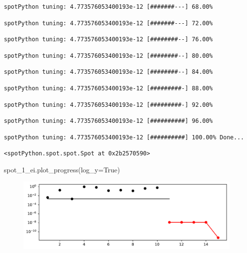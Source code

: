 \documentclass[
  letterpaper,
  DIV=11,
  numbers=noendperiod]{scrreprt}
\newenvironment{Shaded}{\begin{snugshade}}{\end{snugshade}}
\newcommand{\NormalTok}[1]{\textcolor[rgb]{0.00,0.23,0.31}{#1}}
\newcommand{\OperatorTok}[1]{\textcolor[rgb]{0.37,0.37,0.37}{#1}}
\newcommand{\VariableTok}[1]{\textcolor[rgb]{0.07,0.07,0.07}{#1}}
\begin{document}
\begin{verbatim}
spotPython tuning: 4.773576053400193e-12 [#######---] 68.00% 
\end{verbatim}

\begin{verbatim}
spotPython tuning: 4.773576053400193e-12 [#######---] 72.00% 
\end{verbatim}

\begin{verbatim}
spotPython tuning: 4.773576053400193e-12 [########--] 76.00% 
\end{verbatim}

\begin{verbatim}
spotPython tuning: 4.773576053400193e-12 [########--] 80.00% 
\end{verbatim}

\begin{verbatim}
spotPython tuning: 4.773576053400193e-12 [########--] 84.00% 
\end{verbatim}

\begin{verbatim}
spotPython tuning: 4.773576053400193e-12 [#########-] 88.00% 
\end{verbatim}

\begin{verbatim}
spotPython tuning: 4.773576053400193e-12 [#########-] 92.00% 
\end{verbatim}

\begin{verbatim}
spotPython tuning: 4.773576053400193e-12 [##########] 96.00% 
\end{verbatim}

\begin{verbatim}
spotPython tuning: 4.773576053400193e-12 [##########] 100.00% Done...
\end{verbatim}

\begin{verbatim}
<spotPython.spot.spot.Spot at 0x2b2570590>
\end{verbatim}

\begin{Shaded}
\begin{Highlighting}[]
\NormalTok{spot\_1\_ei.plot\_progress(log\_y}\OperatorTok{=}\VariableTok{True}\NormalTok{)}
\end{Highlighting}
\end{Shaded}

\begin{figure}[H]

{\centering \includegraphics{012_num_spot_ei_files/figure-pdf/cell-11-output-1.pdf}

}

\end{figure}
\end{document}
